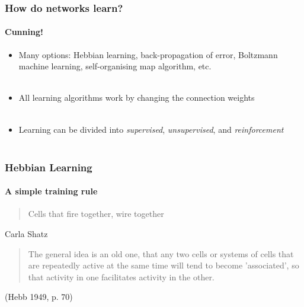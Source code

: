 \documentclass[mathserif]{beamer}
\begin{document}
\begin{frame}
\frametitle{How do networks learn?}
\framesubtitle{Cunning!}
\begin{itemize}
\item Many options: Hebbian learning, back-propagation of error, Boltzmann machine learning, self-organising map algorithm, etc. \\ \

\item All learning algorithms work by changing the connection weights \\ \

\item Learning can be divided into \emph{supervised}, \emph{unsupervised}, and \emph{reinforcement} \\ \ \end{itemize}
\end{frame}

\begin{frame}
\frametitle{Hebbian Learning}
\framesubtitle{A simple training rule}

\begin{quotation}Cells that fire together, wire together\end{quotation} 
\hfill Carla Shatz 

\vfill

\begin{quotation}The general idea is an old one, that any two cells or systems of cells that are repeatedly active at the same time will tend to become 'associated', so that activity in one facilitates activity in the other.\end{quotation} 
\hfill(Hebb 1949, p. 70)




\end{frame}
\end{document}
